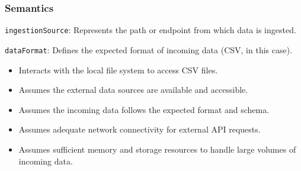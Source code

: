 \documentclass[12pt, titlepage]{article}
\begin{document}
\begin{description}
\begin{description}
\subsubsection{Semantics}
\begin{description}
  \item[State Variables:]
  \item
  \texttt{ingestionSource}: Represents the path or endpoint from which data is ingested.
  \item
  \texttt{dataFormat}: Defines the expected format of incoming data (CSV, in this case).

  \item[Environment Variables:]
  \item
  \begin{itemize}
    \item Interacts with the local file system to access CSV files.
  \end{itemize}
  \item 

  \item[Assumptions:]
  \item
  \begin{itemize}
    \item Assumes the external data sources are available and accessible.
  \end{itemize}
  \item
  \begin{itemize}
    \item Assumes the incoming data follows the expected format and schema.
  \end{itemize}
  \item 
  \begin{itemize}
    \item Assumes adequate network connectivity for external API requests.
  \end{itemize}
  \item
  \begin{itemize}
    \item Assumes sufficient memory and storage resources to handle large volumes of incoming data.
  \end{itemize}
  \item 


\end{description}
\end{description}
\end{description}
\end{document}
